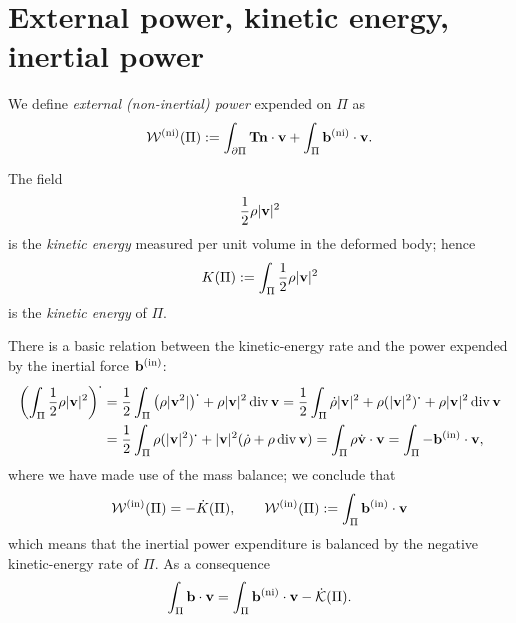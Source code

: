 %
%
%
%

\section{External power, kinetic energy, inertial power}\label{kinetic}
We define \textit{external (non-inertial) power} expended on $\Pi$ as 
\begin{equation}
	\mathcal{W}^{(\rm ni)}(\Pi):=\int_{\partial\Pi}\mathbf{T}\mathbf{n}\cdot\mathbf{v}+\int_{\Pi}\mathbf{b}^{(\rm ni)}\cdot\mathbf{v}.
\end{equation}

The field
\begin{equation}
	\frac{1}{2} \rho |\mathbf{v}|^2
\end{equation}
is the \textit{kinetic energy} measured per unit volume in the deformed body; hence
\begin{equation}
	K(\Pi):=\int_{\Pi}\frac{1}{2} \rho |\mathbf{v}|^2
\end{equation} 
is the \textit{kinetic energy} of $\Pi$.

There is a basic relation between the kinetic-energy rate and the power expended by the inertial force $\mathbf{b}^{(\rm in)}$:
\begin{equation}
	\begin{aligned}
		\left( \int_{\Pi}\frac{1}{2} \rho |\mathbf{v}|^2 \right)^{\operatorname{{\boldsymbol{\cdot}}}}&= \frac{1}{2}\int_{\Pi}\left( \rho|\mathbf{v}^2| \right)^{\operatorname{{\boldsymbol{\cdot}}}}+\rho|\mathbf{v}|^2\operatorname{div}\mathbf{v}=\frac{1}{2}\int_{\Pi}\dot{\rho}|\mathbf{v}|^2+\rho(|\mathbf{v}|^2)^{\operatorname{{\boldsymbol{\cdot}}}}+\rho|\mathbf{v}|^2\operatorname{div}\mathbf{v}\\
		&=\frac{1}{2}\int_{\Pi}\rho(|\mathbf{v}|^2)^{\operatorname{{\boldsymbol{\cdot}}}}+|\mathbf{v}|^2(\dot{\rho}+\rho\operatorname{div}\mathbf{v})=\int_{\Pi}\rho\dot{\mathbf{v}}\cdot\mathbf{v}=\int_{\Pi}-\mathbf{b}^{(\rm in)}\cdot\mathbf{v},
	\end{aligned}
\end{equation}
where we have made use of the mass balance; we conclude that
\begin{equation}
	\mathcal{W}^{(\rm in)}(\Pi)=-\dot K(\Pi), \qquad \mathcal{W}^{(\rm in)}(\Pi):=\int_{\Pi}\mathbf{b}^{(\rm in)}\cdot\mathbf{v}
\end{equation}
which means that the inertial power expenditure is balanced by the negative kinetic-energy rate of $\Pi$. As a consequence
\begin{equation}\label{bpow}
	\int_{\Pi}\mathbf{b}\cdot\mathbf{v}=\int_{\Pi}\mathbf{b}^{(\rm ni)}\cdot\mathbf{v}-\dot{\mathcal{K}}(\Pi).
\end{equation}

